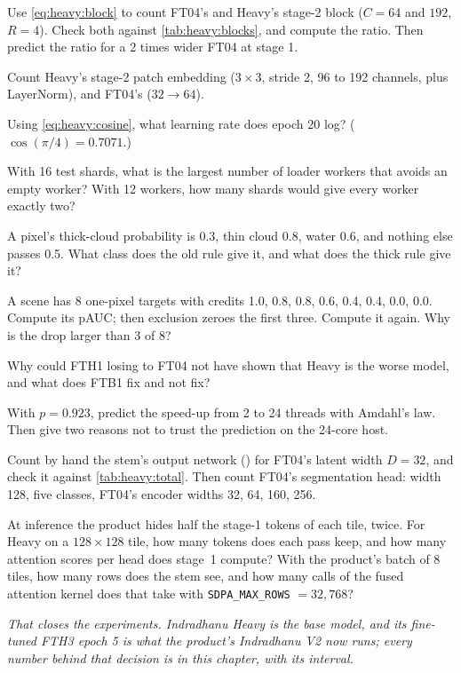 \begin{checkyourself}
\item\label{ex:heavy:1} Use \cref{eq:heavy:block} to count FT04's and Heavy's stage-2 block ($C=64$ and $192$,
$R=4$). Check both against \cref{tab:heavy:blocks}, and compute the ratio. Then predict the ratio for a 2 times
wider FT04 at stage 1.
\item\label{ex:heavy:2} Count Heavy's stage-2 patch embedding ($3\times3$, stride 2, 96 to 192 channels, plus
LayerNorm), and FT04's ($32\to64$).
\item\label{ex:heavy:3} Using \cref{eq:heavy:cosine}, what learning rate does epoch 20 log? ($\cos(\pi/4)=0.7071$.)
\item\label{ex:heavy:4} With 16 test shards, what is the largest number of loader workers that avoids an empty
worker? With 12 workers, how many shards would give every worker exactly two?
\item\label{ex:heavy:5} A pixel's thick-cloud probability is 0.3, thin cloud 0.8, water 0.6, and nothing else passes
0.5. What class does the old rule give it, and what does the thick rule give it?
\item\label{ex:heavy:6} A scene has 8 one-pixel targets with credits 1.0, 0.8, 0.8, 0.6, 0.4, 0.4, 0.0, 0.0. Compute
its pAUC; then exclusion zeroes the first three. Compute it again. Why is the drop larger than 3 of 8?
\item\label{ex:heavy:7} Why could FTH1 losing to FT04 not have shown that Heavy is the worse model, and what does
FTB1 fix and not fix?
\item\label{ex:heavy:8} With $p=0.923$, predict the speed-up from 2 to 24 threads with Amdahl's law. Then give two
reasons not to trust the prediction on the 24-core host.
\item\label{ex:heavy:9} Count by hand the stem's output network () for FT04's latent width $D=32$,
and check it against \cref{tab:heavy:total}. Then count FT04's segmentation head: width 128, five classes, FT04's
encoder widths 32, 64, 160, 256.
\item\label{ex:heavy:10} At inference the product hides half the stage-1 tokens of each tile, twice. For Heavy on a
$128\times128$ tile, how many tokens does each pass keep, and how many attention scores per head does stage~1 compute?
With the product's batch of 8 tiles, how many rows does the stem see, and how many calls of the fused attention
kernel does that take with \texttt{SDPA\_MAX\_ROWS} $=32{,}768$?
\end{checkyourself}

\par\bigskip\noindent\textit{That closes the experiments. Indradhanu Heavy is the base model, and its fine-tuned
FTH3 epoch 5 is what the product's Indradhanu V2 now runs; every number behind that decision is in this chapter,
with its interval.}

